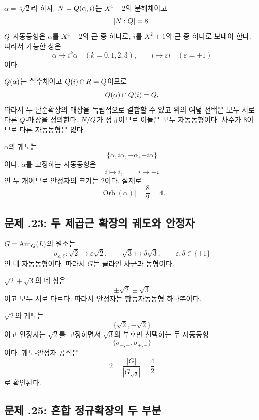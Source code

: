 \begin{solution}
$\alpha=\sqrt[4]{2}$라 하자. $N=Q(\alpha,i)$는 $X^4-2$의 분해체이고
\[
  [N:Q]=8.
\]
$Q$-자동동형은 $\alpha$를 $X^4-2$의 근 중 하나로, $i$를 $X^2+1$의 근 중 하나로 보내야 한다. 따라서 가능한 상은
\[
  \alpha\longmapsto i^k\alpha
  \quad(k=0,1,2,3),
  \qquad
  i\longmapsto\varepsilon i
  \quad(\varepsilon=\pm1)
\]
이다.

$Q(\alpha)$는 실수체이고 $Q(i)\cap R=Q$이므로
\[
  Q(\alpha)\cap Q(i)=Q.
\]
따라서 두 단순확장의 매장을 독립적으로 결합할 수 있고 위의 여덟 선택은 모두 서로 다른 $Q$-매장을 정의한다. $N/Q$가 정규이므로 이들은 모두 자동동형이다. 차수가 $8$이므로 다른 자동동형은 없다.

$\alpha$의 궤도는
\[
  \{\alpha,i\alpha,-\alpha,-i\alpha\}
\]
이다. $\alpha$를 고정하는 자동동형은
\[
  i\longmapsto i,\qquad i\longmapsto-i
\]
인 두 개이므로 안정자의 크기는 $2$이다. 실제로
\[
  |\operatorname{Orb}(\alpha)|
  =\frac{8}{2}=4.
\]
\end{solution}

\subsection*{문제 \thechapter.23: 두 제곱근 확장의 궤도와 안정자}

\begin{solution}
$G=\operatorname{Aut}_Q(L)$의 원소는
\[
  \sigma_{\varepsilon,\delta}:
  \sqrt2\longmapsto\varepsilon\sqrt2,
  \qquad
  \sqrt3\longmapsto\delta\sqrt3,
  \qquad
  \varepsilon,\delta\in\{\pm1\}
\]
인 네 자동동형이다. 따라서 $G$는 클라인 사군과 동형이다.

$\sqrt2+\sqrt3$의 네 상은
\[
  \pm\sqrt2\pm\sqrt3
\]
이고 모두 서로 다르다. 따라서 안정자는 항등자동동형 하나뿐이다.

$\sqrt2$의 궤도는
\[
  \{\sqrt2,-\sqrt2\}
\]
이고 안정자는 $\sqrt2$를 고정하면서 $\sqrt3$의 부호만 선택하는 두 자동동형
\[
  \{\sigma_{+,+},\sigma_{+,-}\}
\]
이다. 궤도-안정자 공식은
\[
  2=\frac{|G|}{|G_{\sqrt2}|}=\frac42
\]
로 확인된다.
\end{solution}

\subsection*{문제 \thechapter.25: 혼합 정규확장의 두 부분}

